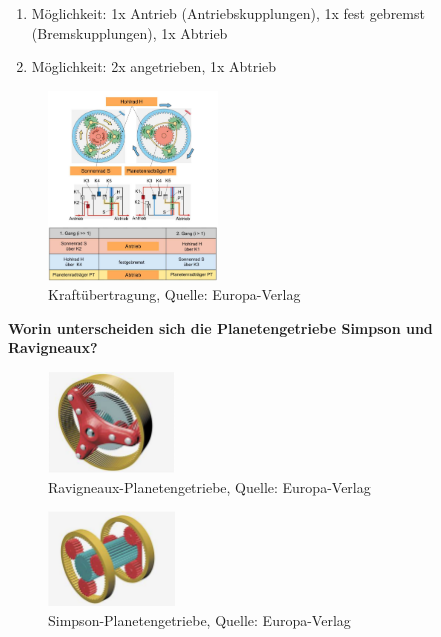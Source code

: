 \begin{enumerate}
\item
  Möglichkeit: 1x Antrieb (Antriebskupplungen), 1x fest gebremst
  (Bremskupplungen), 1x Abtrieb
\item
  Möglichkeit: 2x angetrieben, 1x Abtrieb
\end{enumerate}

\begin{figure}[!ht]%
\centering
\includegraphics[width=0.4\textwidth]{images/Automatikgetriebe/Automatikgetriebe-5.pdf}
\caption{Kraftübertragung, Quelle: Europa-Verlag}
\end{figure}

\newpage

\textbf{Worin unterscheiden sich die Planetengetriebe Simpson und
Ravigneaux?}

\begin{figure}[!ht]%
\centering
\includegraphics[width=0.3\textwidth]{images/Automatikgetriebe/Automatikgetriebe-7.pdf}
\caption{Ravigneaux-Planetengetriebe, Quelle: Europa-Verlag}
\end{figure}

\begin{figure}[!ht]%
\centering
\includegraphics[width=0.3\textwidth]{images/Automatikgetriebe/Automatikgetriebe-8.pdf}
\caption{Simpson-Planetengetriebe, Quelle: Europa-Verlag}
\end{figure}

